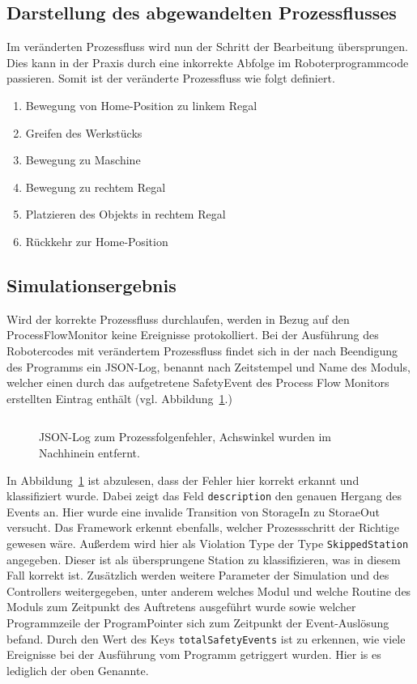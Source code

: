 \subsection{Darstellung des abgewandelten Prozessflusses}
Im veränderten Prozessfluss wird nun der Schritt der Bearbeitung übersprungen.
Dies kann in der Praxis durch eine inkorrekte Abfolge im Roboterprogrammcode
passieren. Somit ist der veränderte Prozessfluss wie folgt definiert.

\begin{enumerate}
  \item Bewegung von Home-Position zu linkem Regal
  \item Greifen des Werkstücks
  \item Bewegung zu Maschine
  \item Bewegung zu rechtem Regal
  \item Platzieren des Objekts in rechtem Regal
  \item Rückkehr zur Home-Position
\end{enumerate}

\subsection{Simulationsergebnis}
Wird der korrekte Prozessfluss durchlaufen, werden in Bezug auf den
ProcessFlowMonitor keine Ereignisse protokolliert.
Bei der Ausführung des Robotercodes mit verändertem Prozessfluss findet sich in
der nach Beendigung des Programms ein JSON-Log, benannt nach
Zeitstempel und Name des Moduls,
welcher einen durch das aufgetretene SafetyEvent des Process Flow Monitors
erstellten Eintrag enthält (vgl. Abbildung~\ref{listing:processflowerror}.)

\begin{figure}[H]
  \inputminted[fontsize=\footnotesize]{json}{code-snippets/processflowerror.json}
  \caption{JSON-Log zum Prozessfolgenfehler, Achswinkel wurden im Nachhinein
  entfernt.}
  \label{listing:processflowerror}
\end{figure}

In Abbildung~\ref{listing:processflowerror} ist abzulesen, dass der
Fehler hier korrekt erkannt und klassifiziert wurde. Dabei zeigt das Feld
\texttt{description} den genauen Hergang des Events an. Hier wurde eine invalide
Transition von StorageIn zu StoraeOut versucht. Das Framework erkennt
ebenfalls, welcher Prozessschritt der Richtige gewesen wäre. Außerdem wird hier
als Violation Type der Type \texttt{SkippedStation} angegeben. Dieser ist als
übersprungene Station zu klassifizieren, was in diesem Fall korrekt ist.
Zusätzlich werden weitere Parameter der Simulation und des Controllers
weitergegeben, unter anderem welches Modul und welche Routine des Moduls zum
Zeitpunkt des Auftretens ausgeführt wurde sowie welcher Programmzeile der
ProgramPointer sich zum Zeitpunkt der Event-Auslösung befand. Durch den Wert des
Keys \texttt{totalSafetyEvents} ist zu erkennen, wie viele Ereignisse bei der
Ausführung vom Programm getriggert wurden. Hier is es lediglich der oben
Genannte.

